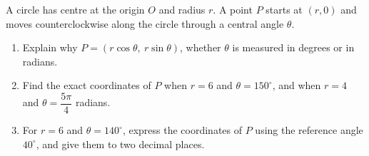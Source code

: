 A circle has centre at the origin $O$ and radius $r$. A point $P$ starts at $(r,0)$ and moves counterclockwise along the circle through a central angle $\theta$.
\begin{enumerate}
\item[(a)] Explain why $P=(r\cos\theta,\ r\sin\theta)$, whether $\theta$ is measured in degrees or in radians.
\item[(b)] Find the exact coordinates of $P$ when $r=6$ and $\theta=150^\circ$, and when $r=4$ and $\theta=\dfrac{5\pi}{4}$ radians.
\item[(c)] For $r=6$ and $\theta=140^\circ$, express the coordinates of $P$ using the reference angle $40^\circ$, and give them to two decimal places.
\end{enumerate}
